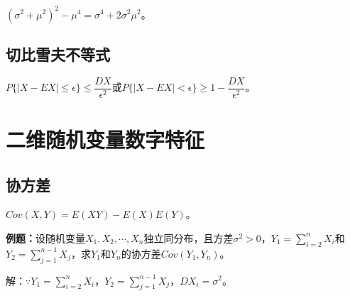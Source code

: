 \documentclass[UTF8, 12pt]{ctexart}
\begin{document}
$(\sigma^2+\mu^2)^2-\mu^4=\sigma^4+2\sigma^2\mu^2$。

\subsection{切比雪夫不等式}

$P\{\vert X-EX\vert\leqslant\epsilon\}\leqslant\dfrac{DX}{\epsilon^2}$或$P\{\vert X-EX\vert<\epsilon\}\geqslant1-\dfrac{DX}{\epsilon^2}$。

\section{二维随机变量数字特征}

\subsection{协方差}

$Cov(X,Y)=E(XY)-E(X)E(Y)$。

\textbf{例题：}设随机变量$X_1,X_2,\cdots,X_n$独立同分布，且方差$\sigma^2>0$，$Y_1=\sum\limits_{i=2}^nX_i$和$Y_2=\sum\limits_{j=1}^{n-1}X_j$，求$Y_1$和$Y_n$的协方差$Cov(Y_1,Y_n)$。

解：$\because Y_1=\sum\limits_{i=2}^nX_i$，$Y_2=\sum\limits_{j=1}^{n-1}X_j$，$DX_i=\sigma^2$。
\end{document}
